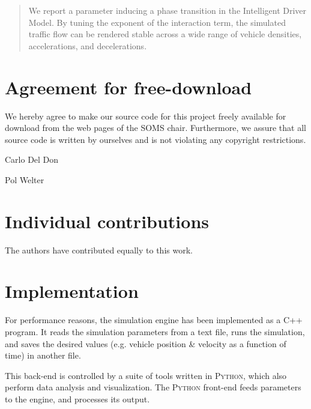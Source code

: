 




\begin{abstract}
We report a parameter inducing a phase transition in the Intelligent Driver Model. By tuning the exponent of the interaction term, the simulated traffic flow can be rendered stable across a wide range of vehicle densities, accelerations, and decelerations.
\end{abstract}
\newpage


\newpage
\section*{Agreement for free-download}
\bigskip\bigskip
\large We hereby agree to make our source code for this project freely available for download from the web pages of the SOMS chair. Furthermore, we assure that all source code is written by ourselves and is not violating any copyright restrictions.

\begin{minipage}[t][2cm][b]{0.45\textwidth}
    \centering Carlo Del Don
\end{minipage}
\begin{minipage}[t][2cm][b]{0.45\textwidth}
    \centering Pol Welter
\end{minipage}

\vspace{5cm}
\section*{Individual contributions}
\bigskip\bigskip
The authors have contributed equally to this work.

\newpage

\tableofcontents

\newpage




\section{Implementation}
For performance reasons, the simulation engine has been implemented as a \textsc{C++} program. It reads the simulation parameters from a text file, runs the simulation, and saves the desired values (e.g. vehicle position \& velocity as a function of time) in another file.

This back-end is controlled by a suite of tools written in \textsc{Python}, which also perform data analysis and visualization. The \textsc{Python} front-end feeds parameters to the engine, and processes its output.

